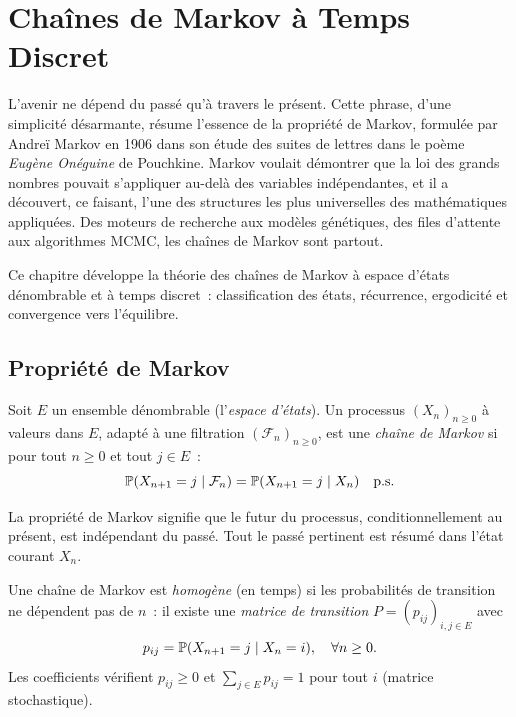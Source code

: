\chapter{Cha\^ines de Markov \`a Temps Discret}
\label{ch:markov_discret}

\og L'avenir ne d\'epend du pass\'e qu'\`a travers le pr\'esent. \fg Cette phrase, d'une simplicit\'e d\'esarmante, r\'esume l'essence de la propri\'et\'e de Markov, formul\'ee par Andre\"i Markov en 1906 dans son \'etude des suites de lettres dans le po\`eme \emph{Eug\`ene On\'eguine} de Pouchkine. Markov voulait d\'emontrer que la loi des grands nombres pouvait s'appliquer au-del\`a des variables ind\'ependantes, et il a d\'ecouvert, ce faisant, l'une des structures les plus universelles des math\'ematiques appliqu\'ees. Des moteurs de recherche aux mod\`eles g\'en\'etiques, des files d'attente aux algorithmes MCMC, les cha\^ines de Markov sont partout.

Ce chapitre d\'eveloppe la th\'eorie des cha\^ines de Markov \`a espace d'\'etats d\'enombrable et \`a temps discret~: classification des \'etats, r\'ecurrence, ergodicité et convergence vers l'\'equilibre.

\section{Propri\'et\'e de Markov}

\begin{definition}
Soit $E$ un ensemble d\'enombrable (l'\emph{espace d'\'etats}). Un processus
$(X_n)_{n \geq 0}$ \`a valeurs dans $E$, adapt\'e \`a une filtration
$(\mathcal{F}_n)_{n \geq 0}$, est une \emph{cha\^ine de Markov} si pour tout
$n \geq 0$ et tout $j \in E$~:
\[
  \mathbb{P}(X_{n+1} = j \mid \mathcal{F}_n) = \mathbb{P}(X_{n+1} = j \mid X_n) \quad \text{p.s.}
\]
\end{definition}

\begin{intuition}[title=\textbf{Absence de m\'emoire}]
La propri\'et\'e de Markov signifie que le futur du processus, conditionnellement
au pr\'esent, est ind\'ependant du pass\'e. Tout le pass\'e pertinent est r\'esum\'e dans
l'\'etat courant $X_n$.
\end{intuition}

\begin{definition}
Une cha\^ine de Markov est \emph{homog\`ene} (en temps) si les probabilit\'es de
transition ne d\'ependent pas de $n$~: il existe une \emph{matrice de transition}
$P = (p_{ij})_{i,j \in E}$ avec
\[
  p_{ij} = \mathbb{P}(X_{n+1} = j \mid X_n = i), \quad \forall n \geq 0.
\]
Les coefficients v\'erifient $p_{ij} \geq 0$ et $\sum_{j \in E} p_{ij} = 1$
pour tout $i$ (matrice stochastique).
\end{definition}

